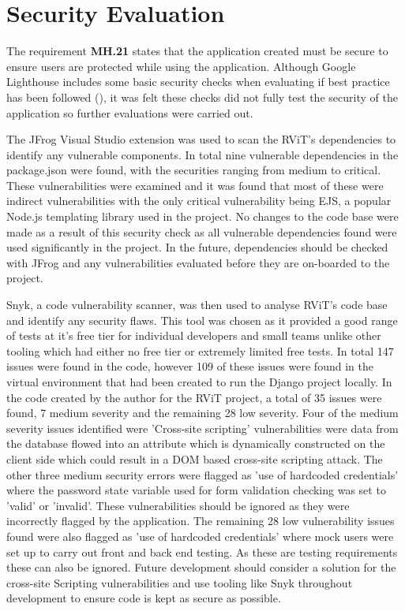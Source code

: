 \documentclass[l4proj.tex]{subfiles}
\begin{document}
\section{Security Evaluation}
The requirement \textbf{MH.21} states that the application created must be secure to ensure users are protected while using the application. Although Google Lighthouse includes some basic security checks when evaluating if best practice has been followed (\cite{LighthouseOverview}), it was felt these checks did not fully test the security of the application so further evaluations were carried out. 

The JFrog Visual Studio extension was used to scan the RViT's dependencies to identify any vulnerable components. In total nine vulnerable dependencies in the package.json were found, with the securities ranging from medium to critical. These vulnerabilities were examined and it was found that most of these were indirect vulnerabilities with the only critical vulnerability being EJS, a popular Node.js templating library used in the project. No changes to the code base were made as a result of this security check as all vulnerable dependencies found were used significantly in the project. In the future, dependencies should be checked with JFrog and any vulnerabilities evaluated before they are on-boarded to the project. 

Snyk, a code vulnerability scanner, was then used to analyse RViT's code base and identify any security flaws. This tool was chosen as it provided a good range of tests at it's free tier for individual developers and small teams unlike other tooling which had either no free tier or extremely limited free tests. In total 147 issues were found in the code, however 109 of these issues were found in the virtual environment that had been created to run the Django project locally. In the code created by the author for the RViT project, a total of 35 issues were found, 7 medium severity and the remaining 28 low severity. Four of the medium severity issues identified were 'Cross-site scripting' vulnerabilities were data from the database flowed into an attribute which is dynamically constructed on the client side which could result in a DOM based cross-site scripting attack. The other three medium security errors were flagged as 'use of hardcoded credentials' where the password state variable used for form validation checking was set to 'valid' or 'invalid'. These vulnerabilities should be ignored as they were incorrectly flagged by the application. The remaining 28 low vulnerability issues found were also flagged as 'use of hardcoded credentials' where mock users were set up to carry out front and back end testing. As these are testing requirements these can also be ignored. Future development should consider a solution for the cross-site Scripting vulnerabilities and use tooling like Snyk throughout development to ensure code is kept as secure as possible.
\end{document}
